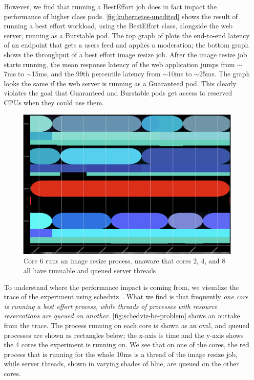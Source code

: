 However, we find that running a BestEffort job does in fact impact the
performance of higher class pods. \autoref{fig:kubernetes-unedited} shows the
result of running a best effort workload, using the BestEffort class, alongside
the web server, running as a Burstable pod. The top graph of plots the
end-to-end latency of an endpoint that gets a users feed and applies a
moderation; the bottom graph shows the throughput of a best effort image resize
job. After the image resize job starts running, the mean response latency of the
web application jumps from $\sim$7ms to $\sim$15ms, and the 99th percentile
latency from $\sim$10ms to $\sim$25ms. The graph looks the same if the web
server is running as a Guaranteed pod. This clearly violates the goal that
Guaranteed and Burstable pods get access to reserved CPUs when they could use
them.


\begin{figure}[t]
    \centering
    \includegraphics[width=\columnwidth]{graphs/schedviz-be-problem.png}
    \caption{Core 6 runs an image resize process, unaware that cores 2, 4, and 8
    all have runnable and queued server threads}\label{fig:schedviz-be-problem}
\end{figure}

To understand where the performance impact is coming from, we visualize the
trace of the experiment using schedviz~\cite{schedviz-tool}. What we find is
that frequently \textit{one core is running a best effort process, while threads
of processes with resource reservations are queued on another}.
\autoref{fig:schedviz-be-problem} shows an outtake from the trace. The process
running on each core is shown as an oval, and queued processes are shown as
rectangles below; the x-axis is time and the y-axis shows the 4 cores the
experiment is running on. We see that on one of the cores, the red process that
is running for the whole 10ms is a thread of the image resize job, while server
threads, shown in varying shades of blue, are queued on the other cores.

